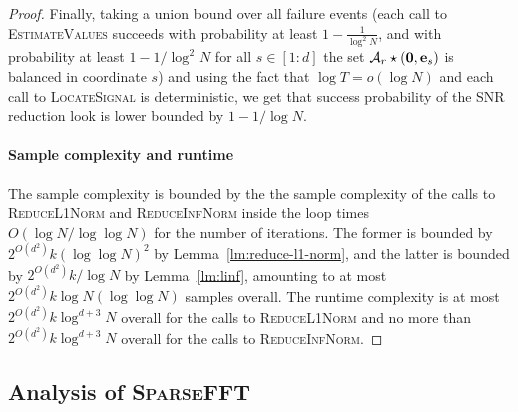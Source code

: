 \begin{proof}
Finally, taking a union bound over all failure events (each call to \textsc{EstimateValues} succeeds with probability at least $1-\frac1{\log^2 N}$, and  with probability at least $1-1/\log^{2} N$ for all $s\in [1:d]$ the set ${\mathcal{A}}_r\star (\mathbf{0}, \mathbf{e}_s)$ is balanced in coordinate $s$) and using the fact that $\log T=o(\log N)$ and each call to \textsc{LocateSignal} is deterministic, we get that success probability of the SNR reduction look is lower bounded by $1-1/\log N$.
 
\paragraph{Sample complexity and runtime} 
The sample complexity is bounded by the the sample complexity of the calls to \textsc{ReduceL1Norm} and \textsc{ReduceInfNorm} inside the loop times $O(\log N/\log\log N)$ for the number of iterations. The former is 
bounded by $2^{O(d^2)}k (\log\log N)^2$ by Lemma~\ref{lm:reduce-l1-norm}, and the latter is bounded by $2^{O(d^2)}k/\log N$ by Lemma~\ref{lm:linf}, amounting to 
at most $2^{O(d^2)} k \log N (\log\log N)$ samples overall. The runtime complexity is at most $2^{O(d^2)} k\log^{d+3} N$ overall for the calls to \textsc{ReduceL1Norm} and no more than $2^{O(d^2)}k \log^{d+3} N$ overall for the calls to \textsc{ReduceInfNorm}.
\end{proof}

\subsection{Analysis of \textsc{SparseFFT}}\label{sec:sfft}




